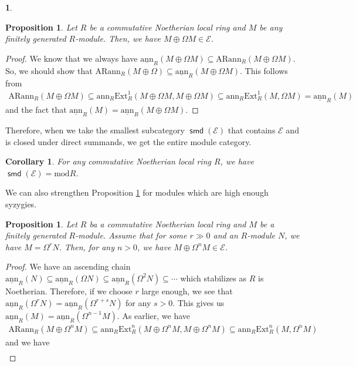 \documentclass[12pt]{amsart}
\newcommand{\Ext}{\mathrm{Ext}}
\newcommand{\ann}{\mathrm{ann}}
\newcommand{\sann}{\underline{\mathrm{ann}}}
\newcommand{\arann}{\mathrm{ARann}}
\newcommand{\module}{\mathrm{mod}}
\newcommand{\EE}{\mathcal{E}}
\newtheorem{proposition}[theorem]{Proposition}
\newtheorem{corollary}[theorem]{Corollary}
\theoremstyle{definition}
\newtheorem{chunk}[theorem]{}
\numberwithin{equation}{theorem}
\def\smd{\operatorname{\mathsf{smd}}}
\begin{document}
\begin{chunk}
    \begin{proposition}\label{direct-sum-of-a-module-and-its-first-syzygy}
        Let $R$ be a commutative Noetherian local ring and $M$ be any finitely generated $R$-module. Then, we have $M \oplus \Omega M \in \EE$.
    \end{proposition}
    \begin{proof}
        We know that we always have $\sann_R(M \oplus \Omega M) \subseteq \arann_R(M \oplus \Omega M)$. So, we should show that $\arann_R(M \oplus \Omega) \subseteq \sann_R(M \oplus \Omega M)$. This follows from 
        \begin{align*}
        \arann_R(M \oplus \Omega M) \subseteq \ann_R \Ext_R^1(M \oplus \Omega M, M \oplus \Omega M) \subseteq \ann_R\Ext_R^1(M , \Omega M) = \sann_R(M)
        \end{align*}
        and the fact that $\sann_R(M) = \sann_R(M \oplus \Omega M) $.
    \end{proof}
    Therefore, when we take the smallest subcategory $\smd(\EE)$ that contains $\EE$ and is closed under direct summands, we get the entire module category.
    \begin{corollary}\label{smd-of-the-category-E}
        For any commutative Noetherian local ring $R$, we have $\smd(\EE) = \module R$.
    \end{corollary}
    We can also strengthen Proposition \ref{direct-sum-of-a-module-and-its-first-syzygy} for modules which are high enough syzygies.
    \begin{proposition}
        Let $R$ ba a commutative Noetherian local ring and $M$ be a finitely generated $R$-module. Assume that for some $r \gg 0$ and an $R$-module $N$, we have $M = \Omega^r N$. Then, for any $n > 0$, we have $M \oplus \Omega^n M \in \EE$.
    \end{proposition}
    \begin{proof}
        We have an ascending chain $\sann_R(N) \subseteq \sann_R(\Omega N) \subseteq \sann_R (\Omega^2 N) \subseteq \cdots$ which stabilizes as $R$ is Noetherian. Therefore, if we choose $r$ large enough, we see that $\sann_R(\Omega^r N) = \sann_R(\Omega^{r+s}N)$ for any $s >0$. This gives us $\sann_R(M) = \sann_R(\Omega^{n-1}M)$. As earlier, we have 
        \begin{align*}
        \arann_R(M \oplus \Omega^n M) \subseteq \ann_R \Ext_R^n(M \oplus \Omega^n M, M \oplus \Omega^n M) \subseteq \ann_R\Ext_R^n(M, \Omega^n M)
        \end{align*}
        and we have 
        \begin{align*}

\end{align*}
\end{proof}
\end{chunk}
\end{document}
